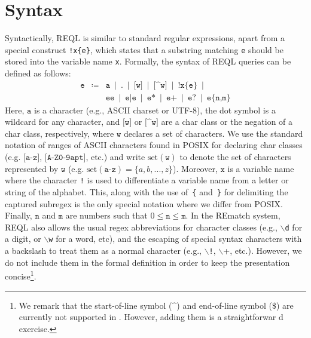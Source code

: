 \section{Syntax} 
Syntactically, REQL is similar to standard regular expressions, apart from a
special construct \texttt{!x\{e\}}, which states that a substring matching
\texttt{e} should be stored into the variable name \texttt{x}. Formally, the
syntax of REQL queries can be defined as follows:
$$
\begin{array}{rcl}
\texttt{e} & \coloneqq & \texttt{a} \ \mid \ \texttt{.} \ \mid \
\texttt{[w]} \ \mid \ \texttt{[\textasciicircum w]} \ \mid \
\texttt{!x\{e\}}  \ \mid \\
& &  \texttt{e} \texttt{e} \ \mid \
\texttt{e|e} \ \mid \ \texttt{e*} \ \mid \ \texttt{e+} \ \mid \ \texttt{e?} \ \mid \ \texttt{e\{n,m\}}
\end{array}
$$
Here, $\texttt{a}$ is a character (e.g., ASCII charset or UTF-8), the dot symbol
is a wildcard for any character, and $\texttt{[w]}$ or
$\texttt{[\textasciicircum w]}$ are a char class or the negation of a char
class, respectively, where $\texttt{w}$ declares a set of characters. We use the
standard notation of ranges of ASCII characters found in POSIX for declaring
char classes (e.g. $\texttt{[a-z]}$, $\texttt{[A-Z0-9apt]}$, etc.) and write
$\text{set}(\texttt{w})$ to denote the set of characters represented by
$\texttt{w}$ (e.g. $\text{set}(\texttt{a-z}) = \{a, b, ..., z\}$). Moreover,
$\texttt{x}$ is a variable name where the character \texttt{!} is used to
differentiate a variable name from a letter or string of the alphabet. This,
along with the use of~\texttt{\{} and~\texttt{\}} for delimiting the captured
subregex is the only special notation where we differ from POSIX. Finally,
$\texttt{n}$ and $\texttt{m}$ are numbers such that $0 \leq \texttt{n} \leq
\texttt{m}$. In the REmatch system, REQL also allows the usual regex
abbreviations for character classes (e.g., \texttt{$\backslash$d} for a digit,
or \texttt{$\backslash$w} for a word, etc), and the escaping of special syntax
characters with a backslash to treat them as a normal character (e.g.,
\texttt{$\backslash$!}, \texttt{$\backslash$}+, etc.). However, we do not
include them in the formal definition in order to keep the presentation
concise\footnote{We remark that the start-of-line symbol
($\texttt{\textasciicircum}$) and end-of-line symbol ($\texttt{\$}$) are
currently not supported in \rematch. However, adding them is a straightforwar d
exercise.}.


